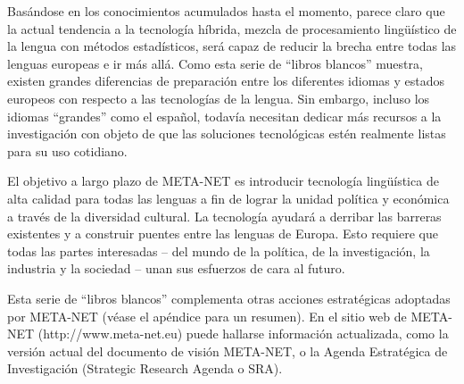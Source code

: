 \begin{multicols}{2}
  
  Basándose en los conocimientos acumulados hasta el momento, parece claro que la actual tendencia a la tecnología híbrida, mezcla de procesamiento lingüístico de la lengua con métodos estadísticos, será capaz de reducir la brecha entre todas las lenguas europeas e ir más allá. Como esta serie de “libros blancos” muestra, existen grandes diferencias de preparación entre los diferentes idiomas y estados europeos con respecto a las tecnologías de la lengua. Sin embargo, incluso los idiomas “grandes” como el español, todavía necesitan dedicar más recursos a la investigación con objeto de que las soluciones tecnológicas estén realmente listas para su uso cotidiano. 

  El objetivo a largo plazo de META-NET es introducir tecnología lingüística de alta calidad para todas las lenguas a fin de lograr la unidad política y económica a través de la diversidad cultural. La tecnología ayudará a derribar las barreras existentes y a construir puentes entre las lenguas de Europa. Esto requiere que todas las partes interesadas -- del mundo de la política, de la investigación, la industria y la sociedad --  unan sus esfuerzos de cara al futuro.
  
  Esta serie de “libros blancos” complementa otras acciones estratégicas adoptadas por META-NET (véase el apéndice para un resumen). En el sitio web de META-NET  (http://www.meta-net.eu) puede hallarse información actualizada, como la versión actual del documento de visión META-NET, o la Agenda Estratégica de Investigación (Strategic Research Agenda o SRA).
  
\end{multicols}

\clearpage



